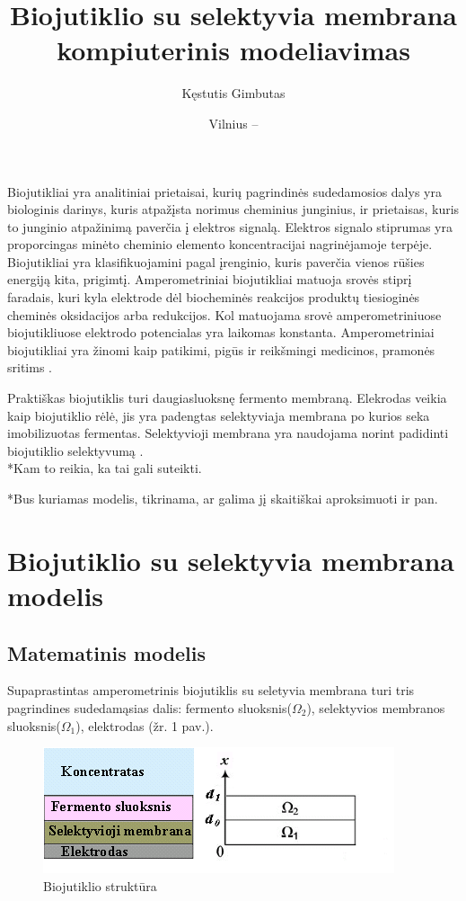 \documentclass[12pt, a4paper, lithuanian]{article}
\title{Biojutiklio su selektyvia membrana kompiuterinis modeliavimas}
\author{
   Kęstutis Gimbutas
}
\date{Vilnius – \the\year}
\begin{document}
\sloppy
\maketitle

\tableofcontents

Biojutikliai yra analitiniai prietaisai, kurių pagrindinės sudedamosios dalys
yra biologinis darinys, kuris atpažįsta norimus cheminius junginius, ir
prietaisas, kuris to junginio atpažinimą  paverčia į elektros signalą. Elektros
signalo stiprumas yra proporcingas minėto cheminio elemento koncentracijai
nagrinėjamoje terpėje. Biojutikliai yra klasifikuojamini pagal įrenginio, kuris
paverčia vienos rūšies energiją kita,
prigimtį. Amperometriniai biojutikliai matuoja srovės stiprį faradais, kuri
kyla elektrode dėl biocheminės reakcijos produktų tiesioginės cheminės oksidacijos 
arba redukcijos. Kol matuojama srovė amperometriniuose biojutikliuose elektrodo potencialas yra
laikomas konstanta. Amperometriniai biojutikliai yra žinomi
kaip patikimi, pigūs ir reikšmingi medicinos, pramonės sritims
\cite{baronas2006computational}.

Praktiškas biojutiklis turi daugiasluoksnę fermento membraną. Elekrodas veikia
kaip biojutiklio rėlė, jis yra padengtas selektyviaja membrana po kurios seka
imobilizuotas fermentas. Selektyvioji membrana yra naudojama norint padidinti
biojutiklio selektyvumą \cite{baronas2006computational}. \\


*Kam to reikia, ka tai gali suteikti.

*Bus kuriamas modelis, tikrinama, ar galima jį skaitiškai aproksimuoti ir pan.

\section{Biojutiklio su selektyvia membrana modelis}

\subsection{Matematinis modelis}

Supaprastintas amperometrinis biojutiklis su seletyvia membrana turi tris
pagrindines sudedamąsias dalis: fermento sluoksnis($\Omega_2$),
selektyvios
membranos sluoksnis($\Omega_1$), elektrodas (žr. 1 pav.).
\begin{figure}[H]
    \centering
    \includegraphics[scale=0.9]{img/modv1}
    \caption{Biojutiklio struktūra}
    \label{biojutiklio-struktura}
\end{figure}
\end{document}
